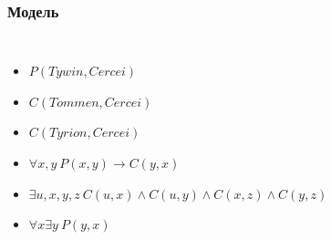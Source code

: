 \documentclass[24pt,pdf,hyperref={unicode},aspectratio=169]{beamer}
\begin{document}
\begin{frame}\frametitle{Модель}
\begin{columns}




\begin{itemize}
\item<4-> $P(Tywin,Cercei)$

\item<5-> $C(Tommen,Cercei)$

\item<6-> $C(Tyrion,Cercei)$

\item<7-> $\forall x,y\ P(x,y)\rightarrow C(y,x)$

\item<8-> $\exists u,x,y,z\ C(u,x)\wedge C(u,y)\wedge C(x,z)\wedge C(y,z)$

\item<9-> $\forall x \exists y\ P(y,x)$
\end{itemize}
\end{columns}
\end{frame}
\end{document}

